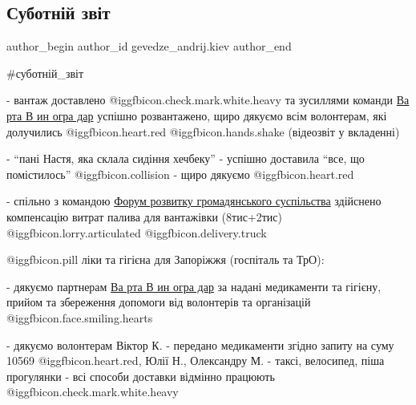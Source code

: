  
 
 
 
 
 
\subsection{Суботній звіт}
\label{sec:01_05_2022.fb.gevedze_andrij.kiev.1.subotnij_zvit}
 
\ifcmt
 author_begin
   author_id gevedze_andrij.kiev
 author_end
\fi


\#суботній\_звіт

- вантаж доставлено  @igg{fbicon.check.mark.white.heavy}  та зусиллями команди
\href{https://www.facebook.com/groups/vartavynohradar/}{Ва рта В ин огра дар}
успішно розвантажено, щиро дякуємо всім волонтерам, які долучились
@igg{fbicon.heart.red} @igg{fbicon.hands.shake}  (відеозвіт у вкладенні)


- \enquote{пані Настя, яка склала сидіння хечбеку} - успішно доставила \enquote{все, що
помістилось}  @igg{fbicon.collision} - щиро дякуємо @igg{fbicon.heart.red}

- спільно з командою \href{https://www.facebook.com/csdf.ua/}{Форум розвитку громадянського суспільства} здійснено
компенсацію витрат палива для вантажівки (8тис+2тис)  @igg{fbicon.lorry.articulated}  @igg{fbicon.delivery.truck} 


 @igg{fbicon.pill}  ліки та гігієна для Запоріжжя (госпіталь та ТрО): 

- дякуємо партнерам \href{https://www.facebook.com/groups/vartavynohradar/}{Ва
рта В ин огра дар} за надані медикаменти та гігієну, прийом та збереження
допомоги від волонтерів та організацій  @igg{fbicon.face.smiling.hearts} 

- дякуємо волонтерам Віктор К. - передано медикаменти згідно запиту на суму
10569 @igg{fbicon.heart.red}, Юлії Н., Олександру М. - таксі, велосипед, піша прогулянки - всі
способи доставки відмінно працюють  @igg{fbicon.check.mark.white.heavy} 

